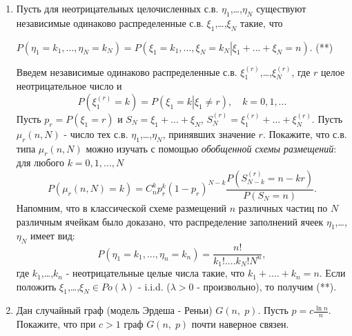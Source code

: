 \begin{problem}
$ $

\begin{enumerate}
\item  Пусть для неотрицательных целочисленных с.в. $\eta _1 
$,{\ldots},$\eta _N $ существуют независимые одинаково распределенные с.в. 
$\xi _1 $,{\ldots},$\xi _N $ такие, что

$P\left( {\eta _1 =k_1 ,...,\eta _N =k_N } \right)=P\left( {\left. {\xi _1 
=k_1 ,...,\xi _N =k_N } \right|\xi _1 +...+\xi _N =n} \right).$ (**)

Введем независимые одинаково распределенные с.в. $\xi _1^{\left( r \right)} 
$,{\ldots},$\xi _N^{\left( r \right)} $, где $r$ целое неотрицательное число 
и
\[
P\left( {\xi _1^{\left( r \right)} =k} \right)=P\left( {\left. {\xi _1 =k} 
\right|\xi _1 \ne r} \right),
\quad
k=0,1,...
\]
Пусть $p_r =P\left( {\xi _1 =r} \right)$ и $S_N =\xi _1 +...+\xi _N $, 
$S_N^{\left( r \right)} =\xi _1^{\left( r \right)} +...+\xi _N^{\left( r 
\right)} $. Пусть $\mu _r \left( {n,N} \right)$ - число тех с.в. $\eta _1 
$,{\ldots},$\eta _N $, принявших значение $r$. Покажите, что с.в. типа $\mu 
_r \left( {n,N} \right)$ можно изучать с помощью \textit{обобщенной схемы размещений}: для любого $k=0,1,...,N$
\[
P\left( {\mu _r \left( {n,N} \right)=k} \right)=C_n^k p_r^k \left( {1-p_r } 
\right)^{N-k}\frac{P\left( {S_{N-k}^{\left( r \right)} =n-kr} 
\right)}{P\left( {S_N =n} \right)}.
\]
Напомним, что в классической схеме размещений $n$ различных частиц по $N$ 
различным ячейкам было доказано, что распределение заполнений ячеек $\eta _1 
$,{\ldots},$\eta _N $ имеет вид:
\[
P\left( {\eta _1 =k_1 ,...,\eta _n =k_n } \right)=\frac{n!}{k_1 !....k_N 
!N^n},
\]
где $k_1 $,{\ldots},$k_n $ - неотрицательные целые числа такие, что $k_1 
+....+k_n =n$. Если положить $\xi _1 $,{\ldots},$\xi _N \in Po\left( \lambda 
\right)$ - i.i.d. ($\lambda >0$ - произвольно), то получим (**).

\item Дан случайный граф (модель Эрдеша - Реньи) $G\left( {n,\;p} \right)$. Пусть 
$p=c\frac{\ln n}{n}$. Покажите, что при $c>1$ граф $G\left( {n,\;p} \right)$ 
почти наверное связен.


\end{enumerate}
\end{problem}







